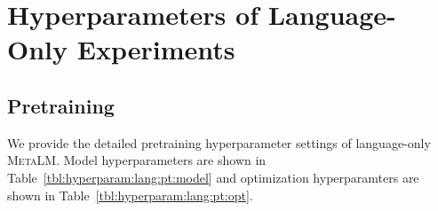 \documentclass{article}
\theoremstyle{plain}
\theoremstyle{definition}
\theoremstyle{remark}
\newcommand\ours{\textsc{MetaLM}}
\begin{document}



\newpage

\appendix

\section{Hyperparameters of Language-Only Experiments}
\label{app:hyperparam:lang}
\subsection{Pretraining}
\label{app:hyperparam:lang:pt}
We provide the detailed pretraining hyperparameter settings of language-only \ours{}.
Model hyperparameters are shown in Table~\ref{tbl:hyperparam:lang:pt:model} and optimization hyperparamters are shown in Table~\ref{tbl:hyperparam:lang:pt:opt}.
\end{document}
